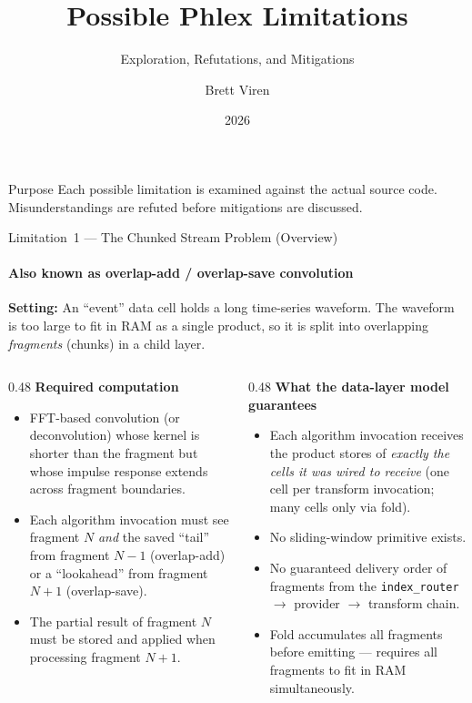 \documentclass[aspectratio=169,10pt]{beamer}
\title{Possible Phlex Limitations}
\subtitle{Exploration, Refutations, and Mitigations}
\author{Brett Viren}
\date{2026}
\newcommand{\code}[1]{\texttt{\small #1}}
\begin{document}
\begin{frame}
  \titlepage
  \begin{block}{Purpose}
    Each possible limitation is examined against the actual source code.
    Misunderstandings are refuted before mitigations are discussed.
  \end{block}
\end{frame}


\begin{frame}{Limitation~1 --- The Chunked Stream Problem (Overview)}
  \framesubtitle{Also known as overlap-add / overlap-save convolution}

  \textbf{Setting:} An ``event'' data cell holds a long time-series waveform.
  The waveform is too large to fit in RAM as a single product, so it is split
  into overlapping \emph{fragments} (chunks) in a child layer.

  \medskip
  \begin{columns}[T]
    \begin{column}{0.48\textwidth}
      \textbf{Required computation} \\[2pt]
      \begin{itemize}\small
        \item FFT-based convolution (or deconvolution) whose kernel is
              shorter than the fragment but whose impulse response extends
              across fragment boundaries.
        \item Each algorithm invocation must see fragment $N$ \emph{and} the
              saved ``tail'' from fragment $N{-}1$ (overlap-add) or a
              ``lookahead'' from fragment $N{+}1$ (overlap-save).
        \item The partial result of fragment $N$ must be stored and applied
              when processing fragment $N{+}1$.
      \end{itemize}
    \end{column}
    \begin{column}{0.48\textwidth}
      \textbf{What the data-layer model guarantees} \\[2pt]
      \begin{itemize}\small
        \item Each algorithm invocation receives the product stores of
              \emph{exactly the cells it was wired to receive}
              (one cell per transform invocation; many cells only via fold).
        \item No sliding-window primitive exists.
        \item No guaranteed delivery order of fragments from the
              \code{index\_router} $\to$ provider $\to$ transform chain.
        \item Fold accumulates all fragments before emitting --- requires
              all fragments to fit in RAM simultaneously.
      \end{itemize}
    \end{column}
  \end{columns}


\end{frame}
\end{document}
